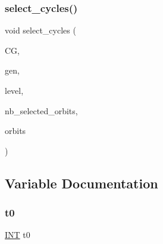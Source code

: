 \subsubsection{\texorpdfstring{select\+\_\+cycles()}{select\_cycles()}}
{\footnotesize\ttfamily void select\+\_\+cycles (\begin{DoxyParamCaption}\item[{\mbox{\hyperlink{classcolored__graph}{colored\+\_\+graph}} $\ast$}]{CG,  }\item[{\mbox{\hyperlink{classgenerator}{generator}} $\ast$}]{gen,  }\item[{\mbox{\hyperlink{galois_8h_a09fddde158a3a20bd2dcadb609de11dc}{I\+NT}}}]{level,  }\item[{\mbox{\hyperlink{galois_8h_a09fddde158a3a20bd2dcadb609de11dc}{I\+NT}} \&}]{nb\+\_\+selected\+\_\+orbits,  }\item[{\mbox{\hyperlink{galois_8h_a09fddde158a3a20bd2dcadb609de11dc}{I\+NT}} $\ast$\&}]{orbits }\end{DoxyParamCaption})}



\subsection{Variable Documentation}
\mbox{\label{all__cycles_8_c_a4268f4fe222ffb119218a0199f5e1904}} 
\subsubsection{\texorpdfstring{t0}{t0}}
{\footnotesize\ttfamily \mbox{\hyperlink{galois_8h_a09fddde158a3a20bd2dcadb609de11dc}{I\+NT}} t0}


